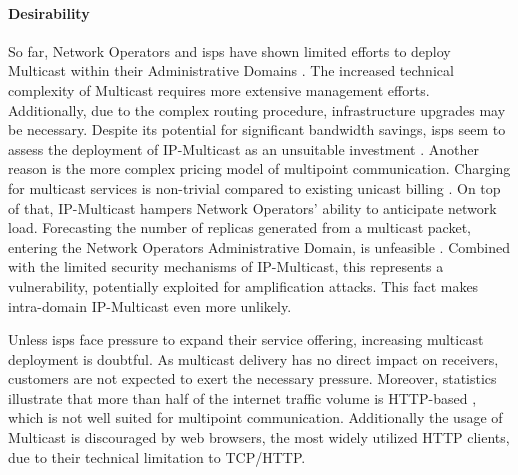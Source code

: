 \paragraph{Desirability} %
\label{par:Desirability}


So far, Network Operators and \glspl{isp} have shown limited efforts to deploy
    Multicast within their Administrative Domains
    \cite{diot2000deployment, ratnasamy2006revisiting, overlay_mc_routing}.
The increased technical complexity of Multicast requires more extensive
    management efforts.
Additionally, due to the complex routing procedure, infrastructure upgrades may
    be necessary.
Despite its potential for significant bandwidth savings, \glspl{isp} seem to assess
    the deployment of IP-Multicast as an unsuitable investment
    \cite{ratnasamy2006revisiting}.
Another reason is the more complex pricing model of multipoint communication.
Charging for multicast services is non-trivial compared to existing unicast
    billing \cite{ratnasamy2006revisiting}.
On top of that, IP-Multicast hampers Network Operators' ability to anticipate
    network load.
Forecasting the number of replicas generated from a multicast packet, entering
    the Network Operators Administrative Domain, is unfeasible
    \cite{diot2000deployment}.
Combined with the limited security mechanisms of IP-Multicast, this represents
    a vulnerability, potentially exploited for amplification attacks.
This fact makes intra-domain IP-Multicast even more unlikely.

Unless \glspl{isp} face pressure to expand their service offering, increasing
    multicast deployment is doubtful.
As multicast delivery has no direct impact on receivers, customers are not 
    expected to exert the necessary pressure.
Moreover, statistics illustrate that more than half of the internet traffic
    volume is HTTP-based \cite{cloudflare2023radar}, which is not well suited
    for multipoint communication.
Additionally the usage of Multicast is discouraged by web browsers, the most 
    widely utilized HTTP clients, due to their technical limitation to
    TCP/HTTP\footnotemark.

